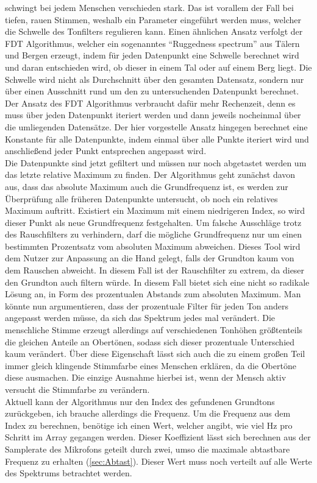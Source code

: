 schwingt bei jedem Menschen verschieden stark. Das ist vorallem der Fall bei tiefen, rauen Stimmen, weshalb ein Parameter eingeführt werden muss, welcher die Schwelle des Tonfilters regulieren kann. Einen ähnlichen Ansatz verfolgt der FDT Algorithmus, welcher ein sogenanntes ``Ruggedness spectrum'' aus Tälern und Bergen erzeugt, indem für jeden Datenpunkt eine Schwelle berechnet wird und daran entschieden wird, ob dieser in einem Tal oder auf einem Berg liegt. Die Schwelle wird nicht als Durchschnitt über den gesamten Datensatz, sondern nur über einen Ausschnitt rund um den zu untersuchenden Datenpunkt berechnet. Der Ansatz des FDT Algorithmus verbraucht dafür mehr Rechenzeit, denn es muss über jeden Datenpunkt iteriert werden und dann jeweils nocheinmal über die umliegenden Datensätze. Der hier vorgestelle Ansatz hingegen berechnet eine Konstante für alle Datenpunkte, indem einmal über alle Punkte iteriert wird und anschließend jeder Punkt entsprechen angepasst wird. \\
Die Datenpunkte sind jetzt gefiltert und müssen nur noch abgetastet werden um das letzte relative Maximum zu finden. Der Algorithmus geht zunächst davon aus, dass das absolute Maximum auch die Grundfrequenz ist, es werden zur Überprüfung alle früheren Datenpunkte untersucht, ob noch ein relatives Maximum auftritt. Existiert ein Maximum mit einem niedrigeren Index, so wird dieser Punkt als neue Grundfrequenz festgehalten. Um falsche Ausschläge trotz des Rauschfilters zu verhindern, darf die mögliche Grundfrequenz nur um einen bestimmten Prozentsatz vom absoluten Maximum abweichen. Dieses Tool wird dem Nutzer zur Anpassung an die Hand gelegt, falls der Grundton kaum von dem Rauschen abweicht. In diesem Fall ist der Rauschfilter zu extrem, da dieser den Grundton auch filtern würde. In diesem Fall bietet sich eine nicht so radikale Lösung an, in Form des prozentualen Abstands zum absoluten Maximum. Man könnte nun argumentieren, dass der prozentuale Filter für jeden Ton anders angepasst werden müsse, da sich das Spektrum jedes mal verändert. Die menschliche Stimme erzeugt allerdings auf verschiedenen Tonhöhen größtenteils die gleichen Anteile an Obertönen, sodass sich dieser prozentuale Unterschied kaum verändert. Über diese Eigenschaft lässt sich auch die zu einem großen Teil immer gleich klingende Stimmfarbe eines Menschen erklären, da die Obertöne diese ausmachen. Die einzige Ausnahme hierbei ist, wenn der Mensch aktiv versucht die Stimmfarbe zu verändern. \\
Aktuell kann der Algorithmus nur den Index des gefundenen Grundtons zurückgeben, ich brauche allerdings die Frequenz. Um die Frequenz aus dem Index zu berechnen, benötige ich einen Wert, welcher angibt, wie viel Hz pro Schritt im Array gegangen werden. Dieser Koeffizient lässt sich berechnen aus der Samplerate des Mikrofons geteilt durch zwei, umso die maximale abtastbare Frequenz zu erhalten (\ref{sec:Abtast}). Dieser Wert muss noch verteilt auf alle Werte des Spektrums betrachtet werden.
